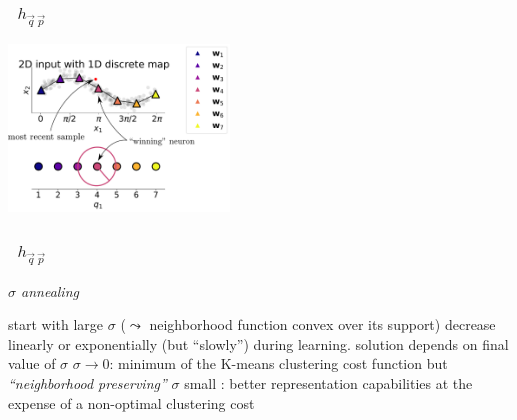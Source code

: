 \begin{frame}[t] \frametitle{\subsecname~$h_{\vec{q} \, \vec{p}}$} 

\svspace{-5mm}

\begin{center}
	\includegraphics[width=0.44\textwidth]{img/sin_manifold_map_rbf}
\end{center}


\svspace{-3mm}



\svspace{-3mm}


\begin{itemize}
\end{itemize}

\end{frame}


\begin{frame}[t] \frametitle{\subsecname~$h_{\vec{q} \, \vec{p}}$} 
\emph{$\sigma$ annealing}
\begin{itemize}
      \itr start with large
        $\sigma$  ($\leadsto$ neighborhood function convex over
        its support)
      \itr decrease linearly or exponentially (but
        ``slowly'') during learning.
       \itr solution depends on 
        final value of $\sigma$
        \vspace{0.5cm}
       \itr $\sigma \rightarrow 0$: minimum of the K-means clustering cost function but 
            \emph{``neighborhood preserving''}  \itr $\sigma$ small : better representation capabilities at the expense of a non-optimal clustering cost 
\end{itemize}


\end{frame}

